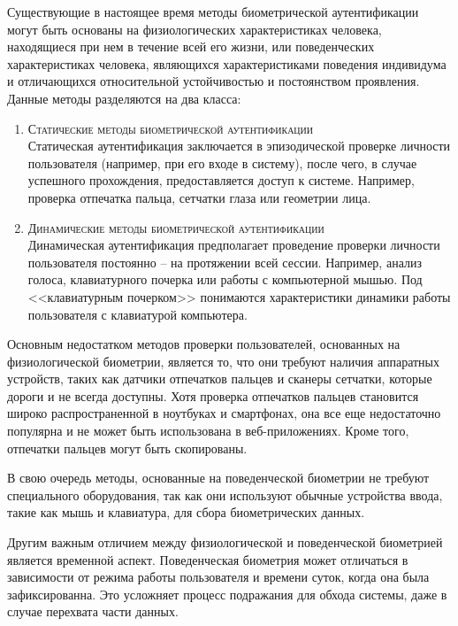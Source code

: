 \documentclass[12pt]{article}
\begin{document}
    \par Существующие в настоящее время методы биометрической аутентификации могут быть основаны на физиологических характеристиках человека, находящиеся при нем в течение всей его жизни, или поведенческих характеристиках человека, являющихся характеристиками поведения индивидума и отличающихся относительной устойчивостью и постоянством проявления. Данные методы разделяются на два класса:

    \begin{enumerate}
        \item \textsc{Статические методы биометрической аутентификации} \\
        Статическая аутентификация заключается в эпизодической проверке личности пользователя (например, при его входе в систему), после чего, в случае успешного прохождения, предоставляется доступ к системе. Например, проверка отпечатка пальца, сетчатки глаза или геометрии лица.

        \item \textsc{Динамические методы биометрической аутентификации} \\
        Динамическая аутентификация предполагает проведение проверки личности пользователя постоянно -- на протяжении всей сессии. Например, анализ голоса, клавиатурного почерка или работы с компьютерной мышью. Под <<клавиатурным почерком>> понимаются характеристики динамики работы пользователя с клавиатурой компьютера.
    \end{enumerate}

    \par Основным недостатком методов проверки пользователей, основанных на физиологической биометрии, является то, что они требуют наличия аппаратных устройств, таких как датчики отпечатков пальцев и сканеры сетчатки, которые дороги и не всегда доступны. Хотя проверка отпечатков пальцев становится широко распространенной в ноутбуках и смартфонах, она все еще недостаточно популярна и не может быть использована в веб-приложениях. Кроме того, отпечатки пальцев могут быть скопированы.

    \par В свою очередь методы, основанные на поведенческой биометрии не требуют специального оборудования, так как они используют обычные устройства ввода, такие как мышь и клавиатура, для сбора биометрических данных.

    \par Другим важным отличием между физиологической и поведенческой биометрией является временной аспект. Поведенческая биометрия может отличаться в зависимости от режима работы пользователя и времени суток, когда она была зафиксированна. Это усложняет процесс подражания для обхода системы, даже в случае перехвата части данных.
\end{document}
